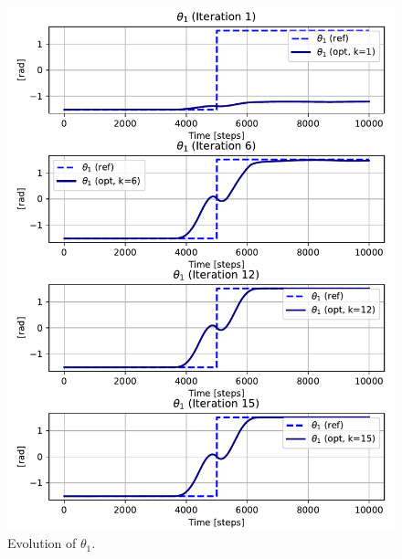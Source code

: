 \begin{figure}[htb]
    \centering
    \includegraphics[width=1\linewidth]{img/1-Task1/th1_evolution.pdf}
    \caption{Evolution of $\theta_1$.}
    \label{fig:theta1-evolution}
\end{figure}

